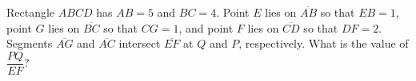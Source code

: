 Rectangle $ABCD$ has $AB=5$ and $BC=4$. Point $E$ lies on $\overline{AB}$ so that $EB=1$, point $G$ lies on $\overline{BC}$ so that $CG=1$, and point $F$ lies on $\overline{CD}$ so that $DF=2$. Segments $\overline{AG}$ and $\overline{AC}$ intersect $\overline{EF}$ at $Q$ and $P$, respectively. What is the value of $\dfrac{PQ}{EF}$?

